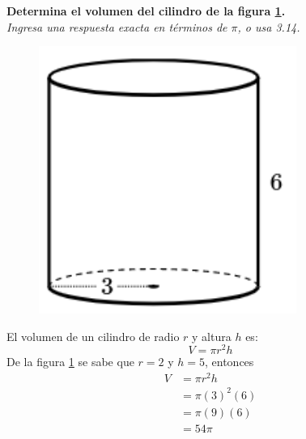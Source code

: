 \question[10] \textbf{Determina el volumen del cilindro de la figura \ref{fig:vol_cil_07}.}\\
\textit{Ingresa una respuesta exacta en términos de $\pi$, o usa 3.14.}

\begin{minipage}{0.3\linewidth}
    \begin{figure}[H]
        \begin{center}
            \includegraphics[width=0.75\textwidth]{../images/vol_cil_07.png}
        \end{center}
        \caption{}
        \label{fig:vol_cil_07}
    \end{figure}
\end{minipage}
\begin{minipage}{0.7\linewidth}
    \begin{solutionbox}{6cm}        El volumen de un cilindro de radio $r$ y altura $h$ es:
        \begin{equation*}
            V = \pi r^2 h
        \end{equation*}
        De la figura \ref{fig:vol_cil_07} se sabe que $r=2$ y $h=5$, entonces
        \begin{equation*}
            \begin{split}
                V & = \pi r^2 h\\
                & = \pi (3)^2 (6)\\
                & = \pi (9) (6)\\
                & = 54\pi
            \end{split}
        \end{equation*}
    \end{solutionbox}
\end{minipage}